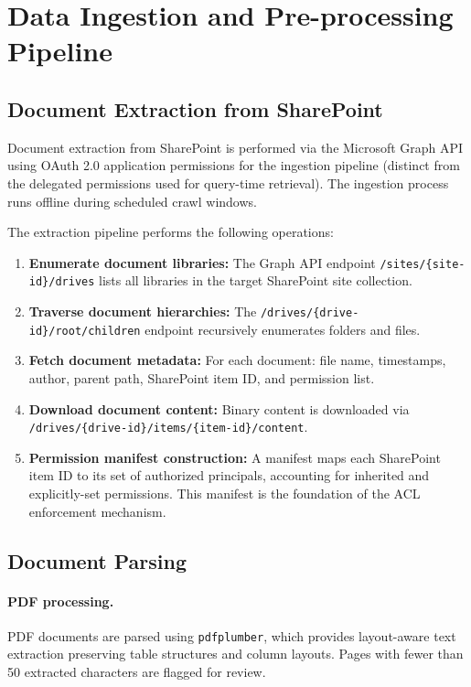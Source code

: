 \section{Data Ingestion and Pre-processing Pipeline}
\label{sec:arch-ingestion}

\subsection{Document Extraction from SharePoint}

Document extraction from SharePoint is performed via the Microsoft Graph API using OAuth 2.0 application permissions for the ingestion pipeline (distinct from the delegated permissions used for query-time retrieval). The ingestion process runs offline during scheduled crawl windows.

The extraction pipeline performs the following operations:

\begin{enumerate}
  \item \textbf{Enumerate document libraries:} The Graph API endpoint \texttt{/sites/\{site-id\}/drives} lists all libraries in the target SharePoint site collection.
  \item \textbf{Traverse document hierarchies:} The \texttt{/drives/\{drive-id\}/root/children} endpoint recursively enumerates folders and files.
  \item \textbf{Fetch document metadata:} For each document: file name, timestamps, author, parent path, SharePoint item ID, and permission list.
  \item \textbf{Download document content:} Binary content is downloaded via \texttt{/drives/\{drive-id\}/items/\{item-id\}/content}.
  \item \textbf{Permission manifest construction:} A manifest maps each SharePoint item ID to its set of authorized principals, accounting for inherited and explicitly-set permissions. This manifest is the foundation of the ACL enforcement mechanism.
\end{enumerate}

\subsection{Document Parsing}

\paragraph{PDF processing.} PDF documents are parsed using \texttt{pdfplumber}, which provides layout-aware text extraction preserving table structures and column layouts. Pages with fewer than 50 extracted characters are flagged for review.

